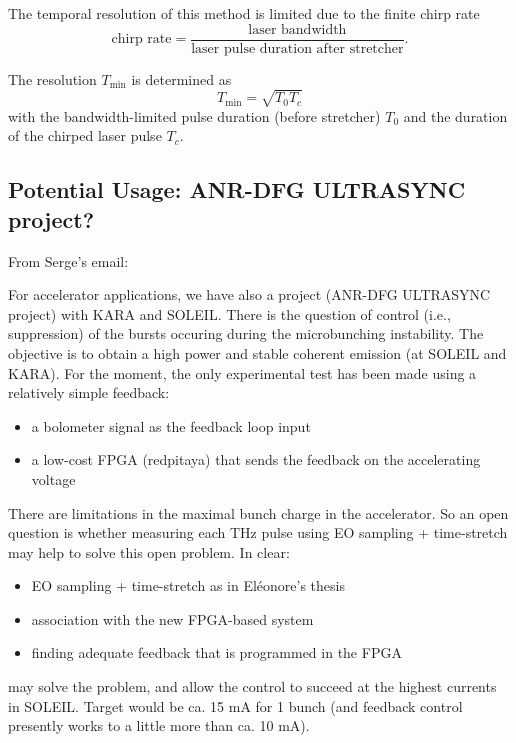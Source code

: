 The temporal resolution of this method is limited due to the finite chirp rate
\begin{equation}
	\text{chirp rate} = \frac{\text{laser bandwidth}}{\text{laser pulse duration after stretcher}}.
\end{equation}

The resolution $T_{\text{min}}$ is determined as
\begin{equation}
	T_{\text{min}} = \sqrt{T_0 T_c}
\end{equation}
with the bandwidth-limited pulse duration (before stretcher) $T_0$ and the duration of the chirped laser pulse $T_c$.


\subsection*{Potential Usage: ANR-DFG ULTRASYNC project?}
From Serge's email:

For accelerator applications, we have also a project (ANR-DFG ULTRASYNC project) with KARA and SOLEIL.
There is the question of control (i.e., suppression) of the bursts occuring during the microbunching instability. The objective is to obtain a high power and stable coherent emission (at SOLEIL and KARA). For the moment, the only experimental test has been made using a relatively simple feedback:
\begin{itemize}
	\item a bolometer signal as the feedback loop input
	\item a low-cost FPGA (redpitaya) that sends the feedback on the accelerating voltage
\end{itemize}

There are limitations in the maximal bunch charge in the accelerator. So an open question is whether measuring each THz pulse using EO sampling + time-stretch may help to solve this open problem. In clear:

\begin{itemize}
	\item EO sampling + time-stretch as in Eléonore's thesis
	\item association with the new FPGA-based system
	\item finding adequate feedback that is programmed in the FPGA
\end{itemize}
may solve the problem, and allow the control to succeed at the highest currents in SOLEIL. 
Target would be ca. 15 mA for 1 bunch (and feedback control presently works to a little more than ca. 10 mA).



